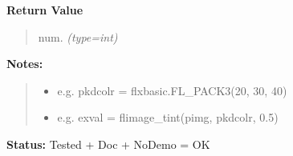 \begin{boxedminipage}{\funcwidth}
\begin{quote}
      \end{quote}

      \textbf{Return Value}
    \vspace{-1ex}

      \begin{quote}

num.
      {\it (type=int)}

      \end{quote}

\textbf{Notes:}
\begin{quote}
  \begin{itemize}

  \item
    \setlength{\parskip}{0.6ex}

e.g. pkdcolr = flxbasic.FL\_PACK3(20, 30, 40)


  \item 
e.g. exval = flimage\_tint(pimg, pkdcolr, 0.5)


\end{itemize}

\end{quote}

\textbf{Status:} 
Tested + Doc + NoDemo = OK


    \end{boxedminipage}

    \label{xformslib:flflimage:flimage_rotate}

    \vspace{0.5ex}

